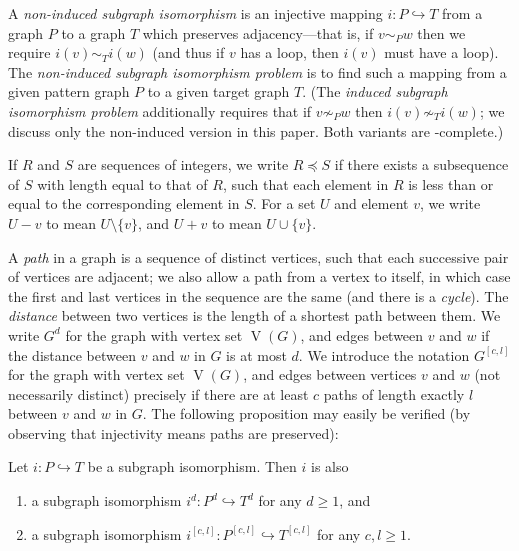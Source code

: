 \documentclass{llncs}
\begin{document}
A \emph{non-induced subgraph isomorphism} is an injective mapping $i : P \hookrightarrow T$ from a
graph $P$ to a graph $T$ which preserves adjacency---that is, if $v \sim_{P} w$ then we require
$i(v) \sim_{T} i(w)$ (and thus if $v$ has a loop, then $i(v)$ must have a loop). The
\emph{non-induced subgraph isomorphism problem} is to find such a mapping from a given pattern graph
$P$ to a given target graph $T$.  (The \emph{induced subgraph isomorphism problem} additionally
requires that if $v \not\sim_{P} w$ then $i(v) \not\sim_{T} i(w)$; we discuss only the non-induced
version in this paper. Both variants are \NP-complete.)

If $R$ and $S$ are sequences of integers, we write $R \preceq S$ if there exists a subsequence of
$S$ with length equal to that of $R$, such that each element in $R$ is less than or equal to the
corresponding element in $S$.  For a set $U$ and element $v$, we write $U - v$ to mean $U \setminus
\{ v \}$, and $U + v$ to mean $U \cup \{ v \}$.

A \emph{path} in a graph is a sequence of distinct vertices, such that each successive pair of
vertices are adjacent; we also allow a path from a vertex to itself, in which case the first and
last vertices in the sequence are the same (and there is a \emph{cycle}). The \emph{distance}
between two vertices is the length of a shortest path between them. We write $G^d$ for the graph
with vertex set $\operatorname{V}(G)$, and edges between $v$ and $w$ if the distance between $v$ and
$w$ in $G$ is at most $d$.  We introduce the notation $G^{\left[c, l\right]}$ for the graph with
vertex set $\operatorname{V}(G)$, and edges between vertices $v$ and $w$ (not necessarily distinct)
precisely if there are at least $c$ paths of length exactly $l$ between $v$ and $w$ in $G$. The
following proposition may easily be verified (by observing that injectivity means paths are
preserved):

\begin{proposition}\label{proposition:supplemental}
    Let $i : P \hookrightarrow T$ be a subgraph isomorphism. Then $i$ is also
    \begin{enumerate}[itemindent=1em,topsep=0pt,itemsep=0.2pt]
        \item a subgraph isomorphism $i^d : P^d \hookrightarrow T^d$ for any $d \ge 1$, and
        \item a subgraph isomorphism $i^{\left[c, l\right]} : P^{\left[c, l\right]} \hookrightarrow
            T^{\left[c, l\right]}$ for any $c, l \ge 1$.
    \end{enumerate}
\end{proposition}
\end{document}
